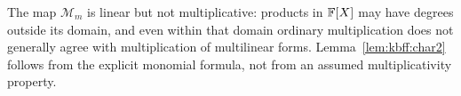 \begin{remark}
The map $\mathscr M_m$ is linear but not multiplicative: products in $\mathbb{F}[X]$ may have degrees outside its domain, and even within that domain ordinary multiplication does not generally agree with multiplication of multilinear forms. Lemma~\ref{lem:kbff:char2} follows from the explicit monomial formula, not from an assumed multiplicativity property.
\end{remark}

